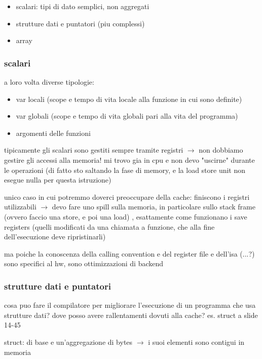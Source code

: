 \begin{itemize}
  \item scalari: tipi di dato semplici, non aggregati
  \item strutture dati e puntatori (piu complessi)
  \item array
\end{itemize}

\subsubsection{scalari}

a loro volta diverse tipologie:
\begin{itemize}
  \item var locali (scope e tempo di vita locale alla funzione in cui sono definite)
  \item var globali (scope e tempo di vita globali pari alla vita del programma)
  \item argomenti delle funzioni
\end{itemize}

tipicamente gli scalari sono gestiti sempre tramite registri $\rightarrow$ non dobbiamo gestire gli accessi alla memoria! mi trovo gia in cpu e non devo "uscirne" durante le operazioni (di fatto sto saltando la fase di memory, e la load store unit non esegue nulla per questa istruzione)

unico caso in cui potremmo doverci preoccupare della cache: finiscono i registri utilizzabili $\rightarrow$ devo fare uno spill sulla memoria, in particolare sullo stack frame (ovvero faccio una store, e poi una load) , esattamente come funzionano i save registers (quelli modificati da una chiamata a funzione, che alla fine dell'esecuzione deve ripristinarli)

ma poiche la conoscenza della calling convention e del register file e dell'isa (...?) sono specifici al hw, sono ottimizzazioni di backend 

\subsubsection{strutture dati e puntatori}

cosa puo fare il compilatore per migliorare l'esecuzione di un programma che usa strutture dati? dove posso avere rallentamenti dovuti alla cache? es. struct a slide 14-45

struct: di base e un'aggregazione di bytes $\rightarrow$ i suoi elementi sono contigui in memoria

